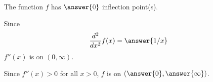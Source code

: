 \documentclass{ximera}
\begin{document}
\begin{exercise}
\begin{exercise}
\begin{exercise}
\begin{exercise}
\begin{exercise}
\begin{exercise}
\begin{exercise}
\begin{exercise}
\begin{exercise}
The function $f$ has $\answer{0}$ inflection point(s).
\begin{exercise}
Since
\[
\frac{d^2}{dx^2}f(x)=\answer{1/x}
\]
$f''(x)$ is  on $(0,\infty)$. 
\begin{exercise}
Since $f''(x)>0$ for all $x>0$, $f$ is  on $(\answer{0},\answer{\infty})$.
\end{exercise}
\end{exercise}
\end{exercise}
\end{exercise}
\end{exercise}
\end{exercise}
\end{exercise}
\end{exercise}
\end{exercise}
\end{exercise}
\end{exercise}
\end{document}
